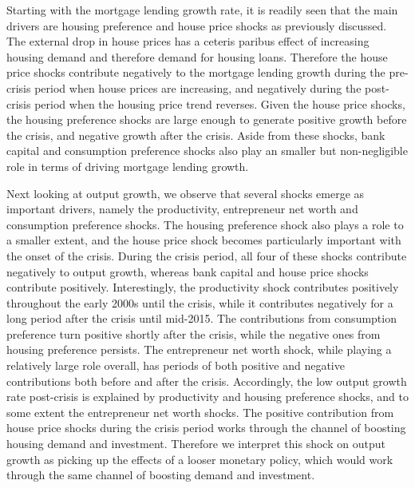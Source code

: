 \documentclass[12pt]{article}
\numberwithin{equation}{section}
\begin{document}
Starting with the mortgage lending growth rate, it is readily seen that the main drivers are housing preference and house price shocks as previously discussed. The external drop in house prices has a ceteris paribus effect of increasing housing demand and therefore demand for housing loans. Therefore the house price shocks contribute negatively to the mortgage lending growth during the pre-crisis period when house prices are increasing, and negatively during the post-crisis period when the housing price trend reverses. Given the house price shocks, the housing preference shocks are large enough to generate positive growth before the crisis, and negative growth after the crisis. Aside from these shocks, bank capital and consumption preference shocks also play an smaller but non-negligible role in terms of driving mortgage lending growth. 

Next looking at output growth, we observe that several shocks emerge as important drivers, namely the productivity, entrepreneur net worth and consumption preference shocks. The housing preference shock also plays a role to a smaller extent, and the house price shock becomes particularly important with the onset of the crisis.  During the crisis period, all four of these shocks contribute negatively to output growth, whereas bank capital and house price shocks contribute positively. Interestingly, the productivity shock contributes positively throughout the early 2000s until the crisis, while it contributes negatively for a long period after the crisis until mid-2015. The contributions from consumption preference turn positive shortly after the crisis, while the negative ones from housing preference persists. The entrepreneur net worth shock, while playing a relatively large role overall, has periods of both positive and negative contributions both before and after the crisis. Accordingly, the low output growth rate post-crisis is explained by productivity and housing preference shocks, and to some extent the entrepreneur net worth shocks. The positive contribution from house price shocks during the crisis period works through the channel of boosting housing demand and investment. Therefore we interpret this shock on output growth as picking up the effects of a looser monetary policy, which would work through the same channel of boosting demand and investment. 
\end{document}
